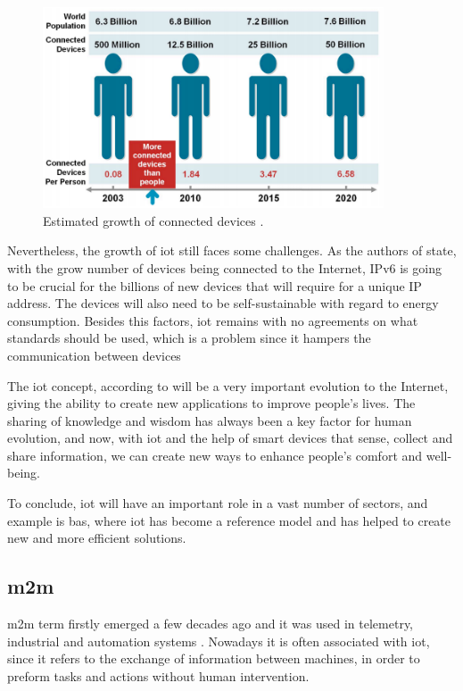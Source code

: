 \begin{figure}[H]
	\centering
	\includegraphics[width=0.9\textwidth]{figures/iot_pic.png}
	\caption{Estimated growth of connected devices \cite{Evans2011}. }
	\label{fig:iot_pic}
\end{figure}

Nevertheless, the growth of \ac{iot} still faces some challenges. As the authors of \cite{Al-fuqaha2015} state, with the grow number of devices being connected to the Internet, IPv6 is going to be crucial for the billions of new devices that will require for a unique IP address. The devices will also need to be self-sustainable with regard to energy consumption. Besides this factors, \ac{iot} remains with no agreements on what standards should be used, which is a problem since it hampers the communication between devices


The \ac{iot} concept, according to \cite{Evans2011} will be a very important evolution to the Internet, giving the ability to create new applications to improve people's lives. The sharing of knowledge and wisdom has always been a key factor for human evolution, and now, with \ac{iot} and the help of smart devices that sense, collect and share information, we can create new ways to enhance people's comfort and well-being.

To conclude, \ac{iot} will have an important role in a vast number of sectors, and example is \ac{bas}, where \ac{iot} has become a reference model and has helped to create new and more efficient solutions.



\subsection{\acf{m2m}}

\acf{m2m} term firstly emerged a few decades ago and it was used in telemetry, industrial and automation systems \cite{}. Nowadays it is often associated with \ac{iot}, since it refers to the exchange of information between machines, in order to preform tasks and actions without human intervention.

